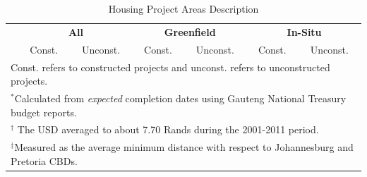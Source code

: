 \documentclass[12pt]{article}
\begin{document}






\vspace{0mm}
\begin{table}[h!]
\centering
\caption{Housing Project Areas Description}\label{table:projectdescriptives}
\vspace{0mm}
\begin{tabular}{l*{1}{cccccc}}
\toprule
  & \multicolumn{2}{c}{\textbf{All}}& \multicolumn{2}{c}{\textbf{Greenfield}}  & \multicolumn{2}{c}{\textbf{In-Situ}}   \\
  &Const. & Unconst. &Const. & Unconst.   & Const. & Unconst. \\
\midrule

\bottomrule
\multicolumn{7}{l}{\scriptsize Const. refers to constructed projects and unconst. refers to unconstructed projects.}\\[-.5em]
\multicolumn{7}{l}{\scriptsize $^*$Calculated from {\it expected} completion dates using Gauteng National Treasury budget reports.}\\[-.5em]
\multicolumn{7}{l}{\scriptsize $^\dagger$ The USD averaged to about 7.70 Rands during the 2001-2011 period.}\\[-.5em]
\multicolumn{7}{l}{\scriptsize $^\ddagger$Measured as the average minimum distance with respect to Johannesburg and Pretoria CBDs. } \\[-.5em]
\end{tabular}
\end{table} 
\end{document}
